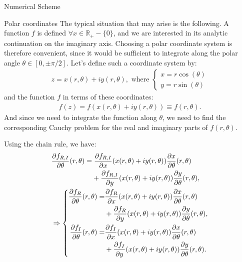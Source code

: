 \begin{section}{Numerical Scheme}
  \begin{subsection}{Polar coordinates}
    The typical situation that may arise is the following. A function
    $f$ is defined $\forall x\in\mathbb{R}_+-\{0\}$, and we are
    interested in its analytic continuation on the imaginary axis.
    Choosing a polar coordinate system
    is therefore convenient, since it would be sufficient to
    integrate along the polar angle $\theta\in[0,\pm\pi/2]$.  Let's
    define such a coordinate system by:
    \begin{align}
      z = x(r,\theta) +iy(r,\theta),\text{ where } \left\{
      \begin{aligned}
        x = r\cos(\theta)\\
        y = r\sin(\theta)
      \end{aligned}
      \right.
    \end{align}
    and the function $f$ in terms of these coordinates:
    \begin{align}
      f(z) = f(x(r,\theta)+iy(r,\theta)) \equiv f(r,\theta).
    \end{align}
    And since we need to integrate the function along $\theta$, we
    need to find the corresponding Cauchy problem for the real and
    imaginary parts of $f(r,\theta)$.

      Using the chain rule, we have:
      \begin{align}
        &\frac{\partial f_{R,I}}{\partial \theta}(r,\theta) = \frac{\partial f_{R,I}}{\partial x}(x(r,\theta)+iy(r,\theta))\frac{\partial x}{\partial \theta}(r,\theta)\\
        &\hphantom{\frac{\partial f_{R,I}}{\partial \theta}(r,\theta) = }+ \frac{\partial f_{R,I}}{\partial y}(x(r,\theta)+iy(r,\theta))\frac{\partial y}{\partial \theta}(r,\theta),\\
        &\Rightarrow \left\{
        \begin{aligned}
          \frac{\partial f_{R}}{\partial \theta}(r,\theta) =& \frac{\partial f_{R}}{\partial x}(x(r,\theta)+iy(r,\theta))\frac{\partial x}{\partial \theta}(r,\theta) \\
          &+ \frac{\partial f_{R}}{\partial y}(x(r,\theta)+iy(r,\theta))\frac{\partial y}{\partial \theta}(r,\theta),\\
          \frac{\partial f_{I}}{\partial \theta}(r,\theta) =& \frac{\partial f_{I}}{\partial x}(x(r,\theta)+iy(r,\theta))\frac{\partial x}{\partial \theta}(r,\theta) \\
          &+ \frac{\partial f_{I}}{\partial y}(x(r,\theta)+iy(r,\theta))\frac{\partial y}{\partial \theta}(r,\theta).
        \end{aligned}
        \right.
      \end{align}


\end{subsection}
\end{section}
